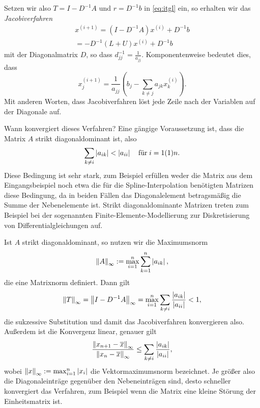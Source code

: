 Setzen wir also $T=I-D^{-1}A$ und $r=D^{-1}b$ in \eqref{eq:itgl} ein,
so erhalten wir das \emph{Jacobiverfahren}
\begin{align}
  x^{(i+1)} = \left(I - D^{-1}A\right)x^{(i)} + D^{-1}b\nonumber\\
  = -D^{-1}\left(L + U\right)x^{(i)} + D^{-1}b
\end{align}
mit der Diagonalmatrix $D$, so dass $d^{-1}_{jj} =
\frac{1}{a_{jj}}$. Komponentenweise bedeutet dies, dass
\begin{equation}
  \label{eq:jacobicomp}
  x_j^{(i+1)} = \frac{1}{a_{jj}}\left(b_j - \sum_{k\neq j} a_{jk}x_k^{(i)}\right).
\end{equation}
Mit anderen Worten, dass Jacobiverfahren löst jede Zeile nach der
Variablen auf der Diagonale auf.

Wann konvergiert dieses Verfahren? Eine gängige Voraussetzung ist,
dass die Matrix $A$ strikt diagonaldominant ist, also
\begin{equation}
  \sum_{k\neq i} \left\lvert{a_{ik}}\right\rvert < \left\lvert{a_{ii}}\right\rvert\quad\text{für}\; i=1(1)n.
\end{equation}
Diese Bedingung ist sehr stark, zum Beispiel erfüllen weder die Matrix
aus dem Eingangsbeispiel noch etwa die für die Spline-Interpolation
benötigten Matrizen diese Bedingung, da in beiden Fällen das
Diagonalelement betragsmäßig die Summe der Nebenelemente
ist. Strikt diagonaldominante Matrizen treten zum Beispiel bei der
sogenannten Finite-Elemente-Modellierung zur Diskretisierung von
Differentialgleichungen auf.

Ist $A$ strikt diagonaldominant, so nutzen wir die Maximumsnorm
\begin{equation}
  \left\lVert{A}\right\rVert_\infty := \max_{i=1}^n \sum_{k=1}^n \left\lvert{a_{ik}}\right\rvert,
\end{equation}
die eine Matrixnorm definiert. Dann gilt
\begin{equation}
  \left\lVert{T}\right\rVert_{\infty} = \left\lVert{I-D^{-1}A}\right\rVert_{\infty} =
  \max_{i=1}^n \sum_{k\neq i} \frac{\left\lvert{a_{ik}}\right\rvert}{\left\lvert{a_{ii}}\right\rvert} < 1,
\end{equation}
die sukzessive Substitution und damit das Jacobiverfahren konvergieren
also. Außerdem ist die Konvergenz linear, genauer gilt
\begin{equation}
  \frac{\left\lVert{x_{n+1} - \overline{x}}\right\rVert_\infty}{\left\lVert{x_{n} - \overline{x}}\right\rVert_\infty}
  \le \sum_{k\neq i} \frac{\left\lvert{a_{ik}}\right\rvert}{\left\lvert{a_{ii}}\right\rvert},
\end{equation}
wobei $\left\lVert{x}\right\rVert_\infty := \max_{i=1}^n \left\lvert{x_i}\right\rvert$ die
Vektormaximumsnorm bezeichnet. Je größer also die Diagonaleinträge
gegenüber den Nebeneinträgen sind, desto schneller konvergiert das
Verfahren, zum Beispiel wenn die Matrix eine kleine Störung der
Einheitsmatrix ist.

